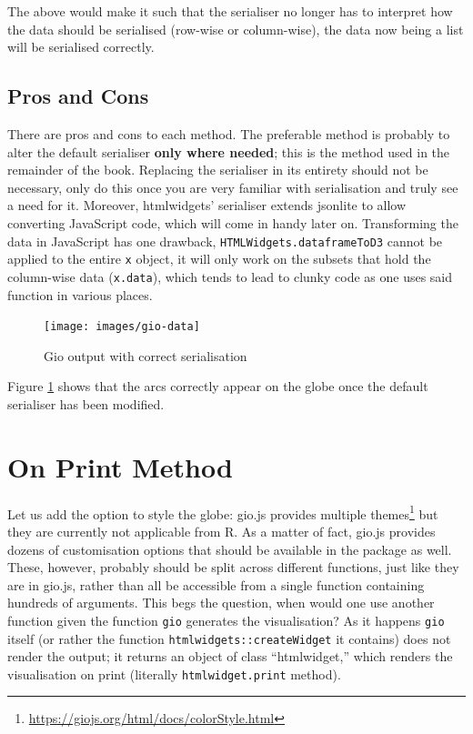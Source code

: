 \documentclass[10pt,]{krantz}
\renewcommand{\href}[2]{#2\footnote{\url{#1}}}
\begin{document}
The above would make it such that the serialiser no longer has to interpret how the data should be serialised (row-wise or column-wise), the data now being a list will be serialised correctly.

\hypertarget{widgets-full-transform-data-conclusion}{%
\subsection{Pros and Cons}\label{widgets-full-transform-data-conclusion}}

There are pros and cons to each method. The preferable method is probably to alter the default serialiser \textbf{only where needed}; this is the method used in the remainder of the book. Replacing the serialiser in its entirety should not be necessary, only do this once you are very familiar with serialisation and truly see a need for it. Moreover, htmlwidgets' serialiser extends jsonlite to allow converting JavaScript code, which will come in handy later on. Transforming the data in JavaScript has one drawback, \texttt{HTMLWidgets.dataframeToD3} cannot be applied to the entire \texttt{x} object, it will only work on the subsets that hold the column-wise data (\texttt{x.data}), which tends to lead to clunky code as one uses said function in various places.

\begin{figure}[H]

{\centering \texttt{[image: images/gio-data]} 

}

\caption{Gio output with correct serialisation}\label{fig:gio-data}
\end{figure}

Figure \ref{fig:gio-data} shows that the arcs correctly appear on the globe once the default serialiser has been modified.

\hypertarget{widgets-full-on-print}{%
\section{On Print Method}\label{widgets-full-on-print}}

Let us add the option to style the globe: gio.js provides multiple \href{https://giojs.org/html/docs/colorStyle.html}{themes} but they are currently not applicable from R. As a matter of fact, gio.js provides dozens of customisation options that should be available in the package as well. These, however, probably should be split across different functions, just like they are in gio.js, rather than all be accessible from a single function containing hundreds of arguments. This begs the question, when would one use another function given the function \texttt{gio} generates the visualisation? As it happens \texttt{gio} itself (or rather the function \texttt{htmlwidgets::createWidget} it contains) does not render the output; it returns an object of class ``htmlwidget,'' which renders the visualisation on print (literally \texttt{htmlwidget.print} method).
\end{document}
